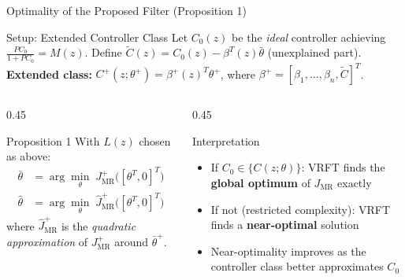 \documentclass[hyperref={pdfpagemode=FullScreen},aspectratio=169]{beamer}
\newcommand{\highlight}[1]{{\color{accentgreen!70!black}\textbf{#1}}}
\begin{document}
\begin{frame}{Optimality of the Proposed Filter (Proposition 1)}
  \begin{block}{Setup: Extended Controller Class}
    Let $C_0(z)$ be the \emph{ideal} controller achieving $\frac{PC_0}{1+PC_0}=M(z)$.
    Define $\tilde{C}(z) = C_0(z) - \beta^T(z)\bar{\theta}$\; (unexplained part).\\[0.4em]
    \textbf{Extended class:} $C^+(z;\theta^+) = \beta^+(z)^T\theta^+$, where $\beta^+ = [\beta_1,\ldots,\beta_n,\tilde{C}]^T$.
  \end{block}
  \begin{columns}[T]
    \begin{column}{0.45\textwidth}
      \begin{exampleblock}{Proposition 1}
        With $L(z)$ chosen as above:
        \begin{align*}
          \bar{\theta} &= \arg\min_\theta\; J^+_{\mathrm{MR}}\bigl([\theta^T,0]^T\bigr)\\[0.3em]
          \hat{\theta} &= \arg\min_\theta\; \hat{J}^+_{\mathrm{MR}}\bigl([\theta^T,0]^T\bigr)
        \end{align*}
        where $\hat{J}^+_{\mathrm{MR}}$ is the \emph{quadratic approximation} of $J^+_{\mathrm{MR}}$ around $\bar{\theta}^+$.
      \end{exampleblock}
    \end{column}
    \begin{column}{0.45\textwidth}
      \begin{block}{Interpretation}
        \begin{itemize}
          \item If $C_0 \in \{C(z;\theta)\}$: VRFT finds the \highlight{global optimum} of $J_{\mathrm{MR}}$ exactly
          \item If not (restricted complexity): VRFT finds a \highlight{near-optimal} solution
          \item Near-optimality improves as the controller class better approximates $C_0$
        \end{itemize}
      \end{block}
    \end{column}
  \end{columns}
\end{frame}

\end{document}
